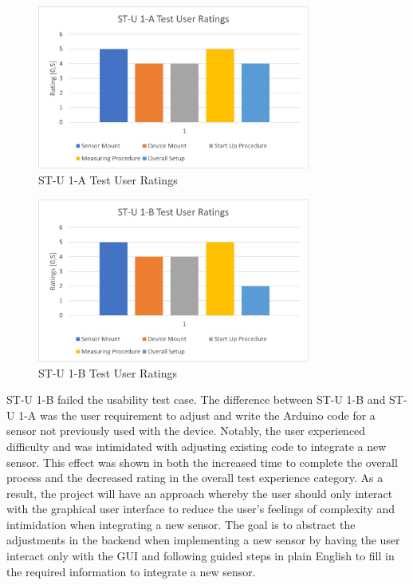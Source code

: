 \documentclass[12pt, titlepage]{article}
\begin{document}
  \begin{figure}[htbp!]
    \begin{center}
    \includegraphics[width=0.8\textwidth]{ST-U_1-A_TestUserRatings}
    \caption{ST-U 1-A Test User Ratings}
    \end{center}
    \end{figure}

  \begin{figure}[htbp!]
    \begin{center}
    \includegraphics[width=0.8\textwidth]{ST-U_1-B_TestUserRatings}
    \caption{ST-U 1-B Test User Ratings}
    \end{center}
    \end{figure}
\newpage
  ST-U 1-B failed the usability test case. The difference between ST-U 1-B and ST-U 1-A was the user requirement to adjust and write the Arduino code for a sensor not previously used with the device. Notably, the user experienced difficulty and was intimidated with adjusting existing code to integrate a new sensor. This effect was shown in both the increased time to complete the overall process and the decreased rating in the overall test experience category. As a result, the project will have an approach whereby the user should only interact with the graphical user interface to reduce the user's feelings of complexity and intimidation when integrating a new sensor. The goal is to abstract the adjustments in the backend when implementing a new sensor by having the user interact only with the GUI and following guided steps in plain English to fill in the required information to integrate a new sensor. \\
\end{document}
